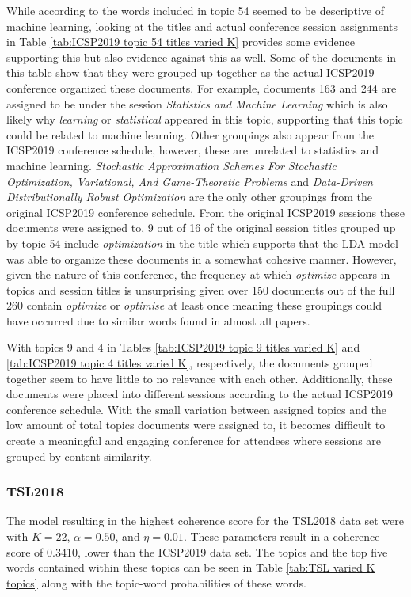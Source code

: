 \documentclass[a4paper, 12pt, twoside]{article}
\numberwithin{equation}{section} %
\begin{document}
While according to the words included in topic 54 seemed to be descriptive of machine learning, looking at the titles and actual conference session assignments in Table \ref{tab:ICSP2019 topic 54 titles varied K} provides some evidence supporting this but also evidence against this as well.  Some of the documents in this table show that they were grouped up together as the actual ICSP2019 conference organized these documents. For example, documents 163 and 244 are assigned to be under the session \textit{Statistics and Machine Learning} which is also likely why \textit{learning} or \textit{statistical} appeared in this topic, supporting that this topic could be related to machine learning. Other groupings also appear from the ICSP2019 conference schedule, however, these are unrelated to statistics and machine learning. \textit{Stochastic Approximation Schemes For Stochastic Optimization, Variational, And Game-Theoretic Problems} and \textit{Data-Driven Distributionally Robust Optimization} are the only other groupings from the original ICSP2019 conference schedule. From the original ICSP2019 sessions these documents were assigned to, 9 out of 16 of the original session titles grouped up by topic 54 include \textit{optimization} in the title which supports that the LDA model was able to organize these documents in a somewhat cohesive manner. However, given the nature of this conference, the frequency at which \textit{optimize} appears in topics and session titles is unsurprising given over 150 documents out of the full 260 contain \textit{optimize} or \textit{optimise} at least once meaning these groupings could have occurred due to similar words found in almost all papers.

With topics 9 and 4 in Tables \ref{tab:ICSP2019 topic 9 titles varied K} and \ref{tab:ICSP2019 topic 4 titles varied K}, respectively, the documents grouped together seem to have little to no relevance with each other. Additionally, these documents were placed into different sessions according to the actual ICSP2019 conference schedule. With the small variation between assigned topics and the low amount of total topics documents were assigned to, it becomes difficult to create a meaningful and engaging conference for attendees where sessions are grouped by content similarity.

\subsubsection{TSL2018}

The model resulting in the highest coherence score for the TSL2018 data set were with $K = 22$, $\alpha = 0.50$, and $\eta = 0.01$. These parameters result in a coherence score of 0.3410, lower than the ICSP2019 data set. The topics and the top five words contained within these topics can be seen in Table \ref{tab:TSL varied K topics} along with the topic-word probabilities of these words. 
\end{document}
